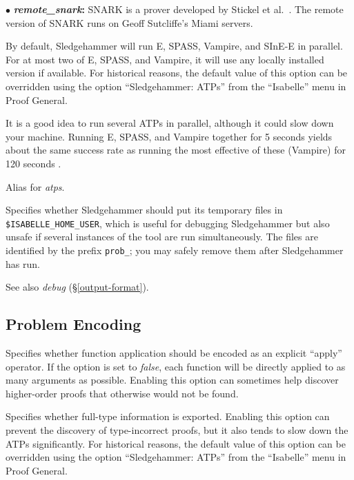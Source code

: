 \documentclass[a4paper,12pt]{article}
\begin{document}
\begin{enum}
\begin{enum}
\item[$\bullet$] \textbf{\textit{remote\_snark}:} SNARK is a prover
developed by Stickel et al.\ \cite{snark}. The remote version of
SNARK runs on Geoff Sutcliffe's Miami servers.
\end{enum}

By default, Sledgehammer will run E, SPASS, Vampire, and SInE-E in parallel.
For at most two of E, SPASS, and Vampire, it will use any locally installed
version if available. For historical reasons, the default value of this option
can be overridden using the option ``Sledgehammer: ATPs'' from the ``Isabelle''
menu in Proof General.

It is a good idea to run several ATPs in parallel, although it could slow down
your machine. Running E, SPASS, and Vampire together for 5 seconds yields about
the same success rate as running the most effective of these (Vampire) for 120
seconds \cite{boehme-nipkow-2010}.

Alias for \textit{atps}.

Specifies whether Sledgehammer should put its temporary files in
\texttt{\$ISA\-BELLE\_\allowbreak HOME\_\allowbreak USER}, which is useful for
debugging Sledgehammer but also unsafe if several instances of the tool are run
simultaneously. The files are identified by the prefix \texttt{prob\_}; you may
safely remove them after Sledgehammer has run.

\nopagebreak
{\small See also \textit{debug} (\S\ref{output-format}).}
\end{enum}

\subsection{Problem Encoding}
\label{problem-encoding}

\begin{enum}
Specifies whether function application should be encoded as an explicit
``apply'' operator. If the option is set to \textit{false}, each function will
be directly applied to as many arguments as possible. Enabling this option can
sometimes help discover higher-order proofs that otherwise would not be found.

Specifies whether full-type information is exported. Enabling this option can
prevent the discovery of type-incorrect proofs, but it also tends to slow down
the ATPs significantly. For historical reasons, the default value of this option
can be overridden using the option ``Sledgehammer: ATPs'' from the ``Isabelle''
menu in Proof General.
\end{enum}
\end{document}
